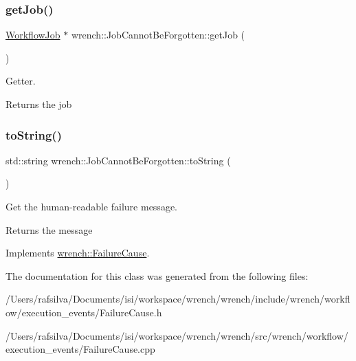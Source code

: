 \subsubsection{\texorpdfstring{get\+Job()}{getJob()}}
{\footnotesize\ttfamily \hyperlink{classwrench_1_1_workflow_job}{Workflow\+Job} $\ast$ wrench\+::\+Job\+Cannot\+Be\+Forgotten\+::get\+Job (\begin{DoxyParamCaption}{ }\end{DoxyParamCaption})}



Getter. 

\begin{DoxyReturn}{Returns}
the job 
\end{DoxyReturn}
\mbox{\label{classwrench_1_1_job_cannot_be_forgotten_abbfbece144c738c9948bf8f01d6bbd53}} 
\subsubsection{\texorpdfstring{to\+String()}{toString()}}
{\footnotesize\ttfamily std\+::string wrench\+::\+Job\+Cannot\+Be\+Forgotten\+::to\+String (\begin{DoxyParamCaption}{ }\end{DoxyParamCaption})\hspace{0.3cm}{\ttfamily [virtual]}}



Get the human-\/readable failure message. 

\begin{DoxyReturn}{Returns}
the message 
\end{DoxyReturn}


Implements \hyperlink{classwrench_1_1_failure_cause_afbad248ebe902409f2cd4f1d6f2b867d}{wrench\+::\+Failure\+Cause}.



The documentation for this class was generated from the following files\+:\begin{DoxyCompactItemize}
\item 
/\+Users/rafsilva/\+Documents/isi/workspace/wrench/wrench/include/wrench/workflow/execution\+\_\+events/Failure\+Cause.\+h\item 
/\+Users/rafsilva/\+Documents/isi/workspace/wrench/wrench/src/wrench/workflow/execution\+\_\+events/Failure\+Cause.\+cpp\end{DoxyCompactItemize}
